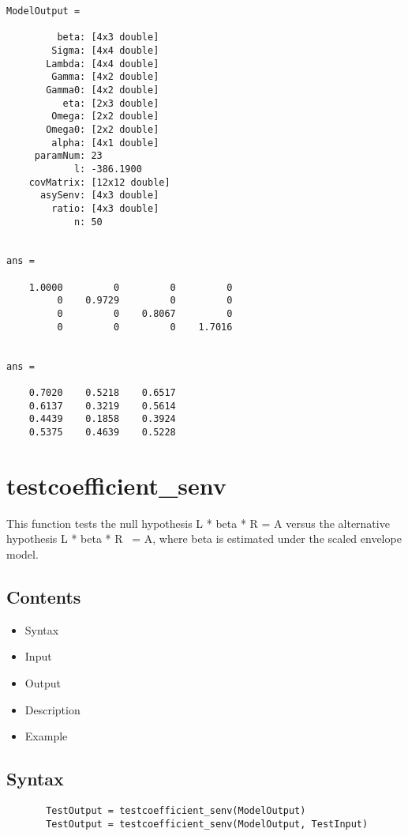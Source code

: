 \documentclass[a4paper,11pt,openany]{memoir}
\begin{document}
        \color{lightgray}\ttfamily \begin{verbatim}
ModelOutput = 

         beta: [4x3 double]
        Sigma: [4x4 double]
       Lambda: [4x4 double]
        Gamma: [4x2 double]
       Gamma0: [4x2 double]
          eta: [2x3 double]
        Omega: [2x2 double]
       Omega0: [2x2 double]
        alpha: [4x1 double]
     paramNum: 23
            l: -386.1900
    covMatrix: [12x12 double]
      asySenv: [4x3 double]
        ratio: [4x3 double]
            n: 50


ans =

    1.0000         0         0         0
         0    0.9729         0         0
         0         0    0.8067         0
         0         0         0    1.7016


ans =

    0.7020    0.5218    0.6517
    0.6137    0.3219    0.5614
    0.4439    0.1858    0.3924
    0.5375    0.4639    0.5228

\end{verbatim} \rmfamily
\color{black}
\newpage

\rmfamily
\color{black}\section{testcoefficient\_senv}


This function tests the null hypothesis L * beta * R = A versus the
alternative hypothesis L * beta * R ~= A, where beta is estimated under
the scaled envelope model.
    
\subsection*{Contents}

\begin{itemize}
\setlength{\itemsep}{-1ex}
   \item Syntax
   \item Input
   \item Output
   \item Description
   \item Example
\end{itemize}


\subsection*{Syntax}


\begin{verbatim}       TestOutput = testcoefficient_senv(ModelOutput)
       TestOutput = testcoefficient_senv(ModelOutput, TestInput)\end{verbatim}
    
\end{document}
